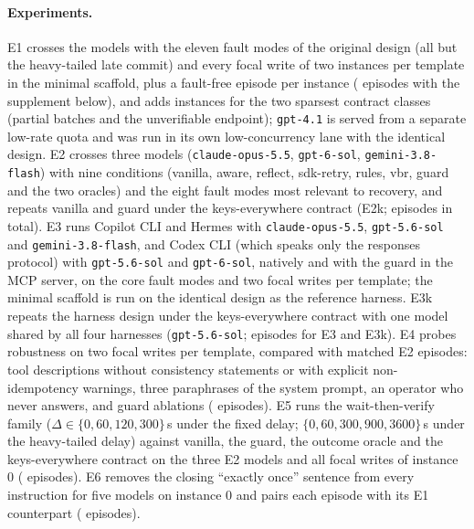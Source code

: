 \paragraph{Experiments.} E1 crosses the \NModels{} models with the eleven fault modes of the original design (all but
the heavy-tailed late commit) and every focal write of two instances per template in the minimal scaffold, plus a
fault-free episode per instance (\NEOne{} episodes with the supplement below), and adds instances for the two
sparsest contract classes (partial batches and the unverifiable endpoint); \texttt{gpt-4.1} is served from a
separate low-rate quota and was run in its own low-concurrency lane with the identical design. E2 crosses three
models (\texttt{claude-opus-5.5}, \texttt{gpt-6-sol}, \texttt{gemini-3.8-flash}) with
nine conditions (vanilla, aware, reflect, sdk-retry, rules, vbr, guard and the two oracles) and the eight fault
modes most relevant to recovery, and repeats vanilla and guard under the keys-everywhere contract (E2k; \NETwo{}
episodes in total). E3 runs Copilot CLI and Hermes with \texttt{claude-opus-5.5}, \texttt{gpt-5.6-sol} and
\texttt{gemini-3.8-flash}, and Codex CLI (which speaks only the responses protocol) with \texttt{gpt-5.6-sol} and
\texttt{gpt-6-sol}, natively and with the guard in the MCP server, on the core fault modes and two focal writes per
template; the minimal scaffold is run on the identical design as the reference harness. E3k repeats the harness
design under the keys-everywhere contract with one model shared by all four harnesses (\texttt{gpt-5.6-sol};
\NEThree{} episodes for E3 and E3k). E4 probes robustness on two focal writes per template, compared with matched
E2 episodes: tool descriptions without consistency statements or with explicit non-idempotency warnings, three
paraphrases of the system prompt, an operator who never answers, and guard ablations (\NEFour{} episodes). E5 runs
the wait-then-verify family ($\Delta \in \{0, 60, 120, 300\}$\,s under the fixed delay; $\{0, 60, 300, 900, 3600\}$\,s
under the heavy-tailed delay) against vanilla, the guard, the outcome oracle and the keys-everywhere contract on the
three E2 models and all focal writes of instance 0 (\NEFive{} episodes). E6 removes the closing ``exactly once''
sentence from every instruction for five models on instance 0 and pairs each episode with its E1 counterpart
(\NESix{} episodes).

